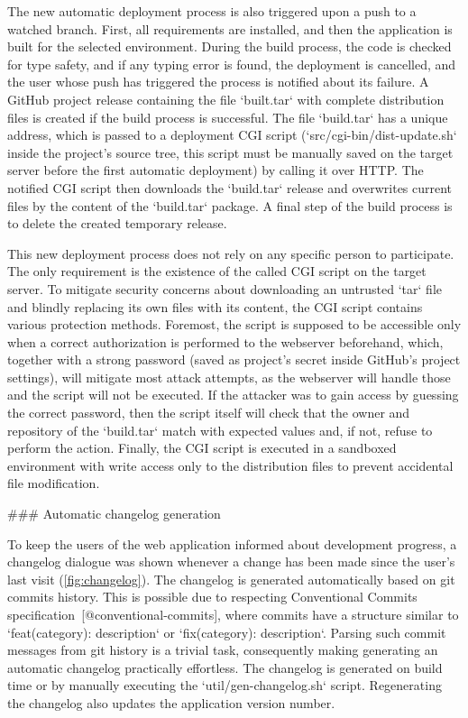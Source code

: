 \documentclass[
  digital, %
  oneside, %
  lof,     %
  nolot,     %
]{fithesis4}
\begin{document}
{The new automatic deployment process is also triggered upon a push to a watched branch. First, all requirements are installed, and then the application is built for the selected environment. During the build process, the code is checked for type safety, and if any typing error is found, the deployment is cancelled, and the user whose push has triggered the process is notified about its failure. A GitHub project release containing the file `built.tar` with complete distribution files is created if the build process is successful. The file `build.tar` has a unique address, which is passed to a deployment \acrshort{CGI} script (`src/cgi-bin/dist-update.sh` inside the project's source tree, this script must be manually saved on the target server before the first automatic deployment) by calling it over \acrshort{HTTP}. The notified \acrshort{CGI} script then downloads the `build.tar` release and overwrites current files by the content of the `build.tar` package. A final step of the build process is to delete the created temporary release.

This new deployment process does not rely on any specific person to participate. The only requirement is the existence of the called \acrshort{CGI} script on the target server. To mitigate security concerns about downloading an untrusted `tar` file and blindly replacing its own files with its content, the \acrshort{CGI} script contains various protection methods. Foremost, the script is supposed to be accessible only when a correct authorization is performed to the webserver beforehand, which, together with a strong password (saved as project's secret inside GitHub's project settings), will mitigate most attack attempts, as the webserver will handle those and the script will not be executed. If the attacker was to gain access by guessing the correct password, then the script itself will check that the owner and repository of the `build.tar` match with expected values and, if not, refuse to perform the action. Finally, the \acrshort{CGI} script is executed in a sandboxed environment with write access only to the distribution files to prevent accidental file modification.

### Automatic changelog generation
\label{chap:changelog}

To keep the users of the web application informed about development progress, a changelog dialogue was shown whenever a change has been made since the user's last visit (\autoref{fig:changelog}). The changelog is generated automatically based on git commits history. This is possible due to respecting Conventional Commits specification~[@conventional-commits], where commits have a structure similar to `feat(category): description` or `fix(category): description`. Parsing such commit messages from git history is a trivial task, consequently making generating an automatic changelog practically effortless. The changelog is generated on build time or by manually executing the `util/gen-changelog.sh` script. Regenerating the changelog also updates the application version number.

}
\end{document}
